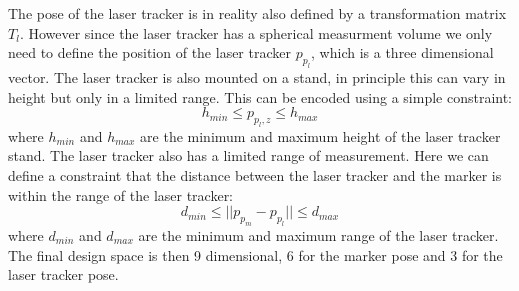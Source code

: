 \documentclass{svproc}
\begin{document}
The pose of the laser tracker is in reality also defined by a transformation matrix $T_{l}$.
However since the laser tracker has a spherical measurment volume we only need to define the position of the laser tracker $p_{p_l}$, which is a three dimensional vector.
The laser tracker is also mounted on a stand, in principle this can vary in height but only in a limited range.
This can be encoded using a simple constraint:
\begin{equation}
    h_{min} \leq p_{p_l,z} \leq h_{max}
\end{equation}
where $h_{min}$ and $h_{max}$ are the minimum and maximum height of the laser tracker stand.
The laser tracker also has a limited range of measurement.
Here we can define a constraint that the distance between the laser tracker and the marker is within the range of the laser tracker:
\begin{equation}
    d_{min} \leq ||p_{p_m} - p_{p_l}|| \leq d_{max}
\end{equation}
where $d_{min}$ and $d_{max}$ are the minimum and maximum range of the laser tracker.
The final design space is then 9 dimensional, 6 for the marker pose and 3 for the laser tracker pose.
\end{document}
